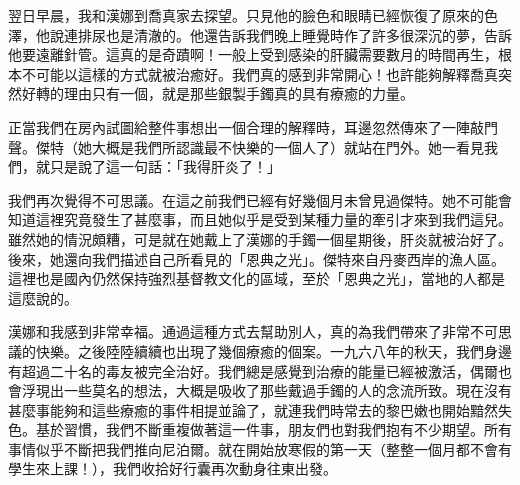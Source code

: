 翌日早晨，我和漢娜到喬真家去探望。只見他的臉色和眼睛已經恢復了原來的色澤，他說連排尿也是清澈的。他還告訴我們晚上睡覺時作了許多很深沉的夢，告訴他要遠離針管。這真的是奇蹟啊！一般上受到感染的肝臟需要數月的時間再生，根本不可能以這樣的方式就被治癒好。我們真的感到非常開心！也許能夠解釋喬真突然好轉的理由只有一個，就是那些銀製手鐲真的具有療癒的力量。

正當我們在房內試圖給整件事想出一個合理的解釋時，耳邊忽然傳來了一陣敲門聲。傑特（她大概是我們所認識最不快樂的一個人了）就站在門外。她一看見我們，就只是說了這一句話：「我得肝炎了！」

我們再次覺得不可思議。在這之前我們已經有好幾個月未曾見過傑特。她不可能會知道這裡究竟發生了甚麼事，而且她似乎是受到某種力量的牽引才來到我們這兒。雖然她的情況頗糟，可是就在她戴上了漢娜的手鐲一個星期後，肝炎就被治好了。後來，她還向我們描述自己所看見的「恩典之光」。傑特來自丹麥西岸的漁人區。這裡也是國內仍然保持強烈基督教文化的區域，至於「恩典之光」，當地的人都是這麼說的。

漢娜和我感到非常幸福。通過這種方式去幫助別人，真的為我們帶來了非常不可思議的快樂。之後陸陸續續也出現了幾個療癒的個案。一九六八年的秋天，我們身邊有超過二十名的毒友被完全治好。我們總是感覺到治療的能量已經被激活，偶爾也會浮現出一些莫名的想法，大概是吸收了那些戴過手鐲的人的念流所致。現在沒有甚麼事能夠和這些療癒的事件相提並論了，就連我們時常去的黎巴嫩也開始黯然失色。基於習慣，我們不斷重複做著這一件事，朋友們也對我們抱有不少期望。所有事情似乎不斷把我們推向尼泊爾。就在開始放寒假的第一天（整整一個月都不會有學生來上課！），我們收拾好行囊再次動身往東出發。
